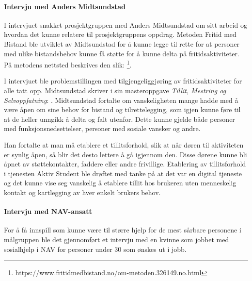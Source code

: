 \paragraph{Intervju med Anders Midtsundstad}
I intervjuet snakket prosjektgruppen med Anders Midtsundstad om sitt arbeid og hvordan det kunne relatere til prosjektgruppens oppdrag. Metoden Fritid med Bistand ble utviklet av Midtsundstad for å kunne legge til rette for at personer med ulike bistandsbehov kunne få støtte for å kunne delta på fritidsaktiviteter. På metodens nettsted beskrives den slik:  \footnote{https://www.fritidmedbistand.no/om-metoden.326149.no.html}. 

I intervjuet ble problemstillingen med tilgjengeliggjøring av fritidsaktiviteter for alle tatt opp. Midtsundstad skriver i sin masteroppgave {\em  Tillit, Mestring og Selvoppfatning}:  \cite{TILLIT:13}. Midtsundstad fortalte om vanskeligheten mange hadde med å være åpen om sine behov for bistand og tilrettelegging, som igjen kunne føre til at de heller unngikk å delta og falt utenfor. Dette kunne gjelde både personer med funksjonsnedsettelser, personer med sosiale vansker og andre. 

Han fortalte at man må etablere et tillitsforhold, slik at når døren til aktiviteten er synlig åpen, så blir det desto lettere å gå igjennom den. Disse dørene kunne bli åpnet av støttekontakter, faddere eller andre frivillige. Etablering av tillitsforhold i tjenesten Aktiv Student ble drøftet med tanke på at det var en digital tjeneste og det kunne vise seg vanskelig å etablere tillit hos brukeren uten menneskelig kontakt og kartlegging av hver enkelt brukers behov.

\paragraph{Intervju med NAV-ansatt}
For å få innspill som kunne være til større hjelp for de mest sårbare personene i målgruppen ble det gjennomført et intervju med en kvinne som jobbet med sosialhjelp i NAV for personer under 30 som ønskes ut i jobb. 

